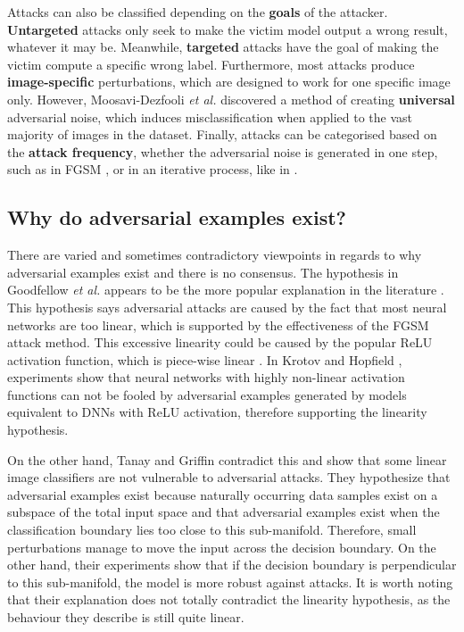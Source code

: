 Attacks can also be classified depending on the \textbf{goals} of the attacker. \textbf{Untargeted} attacks only seek to make the victim model output a wrong result, whatever it may be. Meanwhile, \textbf{targeted} attacks have the goal of making the victim compute a specific wrong label. Furthermore, most attacks produce \textbf{image-specific} perturbations, which are designed to work for one specific image only. However, Moosavi-Dezfooli \textit{et al.} \cite{Moosavi-Dezfooli_2017_CVPR} discovered a method of creating \textbf{universal} adversarial noise, which induces misclassification when applied to the vast majority of images in the dataset. Finally, attacks can be categorised based on the \textbf{attack frequency}, whether the adversarial noise is generated in one step, such as in FGSM \cite{fgsm}, or in an iterative process, like in \cite{carlini2017towards}.

\subsection{Why do adversarial examples exist?}

There are varied and sometimes contradictory viewpoints in regards to why adversarial examples exist and there is no consensus. The hypothesis in Goodfellow \textit{et al.} \cite{fgsm} appears to be the more popular explanation in the literature \cite{akhtar}. This hypothesis says adversarial attacks are caused by the fact that most neural networks are too linear, which is supported by the effectiveness of the FGSM \cite{fgsm} attack method. This excessive linearity could be caused by the popular ReLU activation function, which is piece-wise linear \cite{fgsm}. In Krotov and Hopfield \cite{krotov2018dam}, experiments show that neural networks with highly non-linear activation functions can not be fooled by adversarial examples generated by models equivalent to DNNs with ReLU activation, therefore supporting the linearity hypothesis. 

On the other hand, Tanay and Griffin \cite{tanay2016boundary} contradict this and show that some linear image classifiers are not vulnerable to adversarial attacks. They hypothesize that adversarial examples exist because naturally occurring data samples exist on a subspace of the total input space and that adversarial examples exist when the classification boundary lies too close to this sub-manifold. Therefore, small perturbations manage to move the input across the decision boundary. On the other hand, their experiments show that if the decision boundary is perpendicular to this sub-manifold, the model is more robust against attacks. It is worth noting that their explanation does not totally contradict the linearity hypothesis, as the behaviour they describe is still quite linear.

